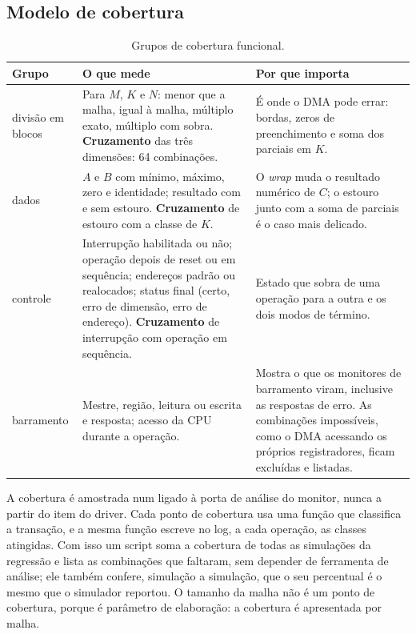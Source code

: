 \documentclass[10pt,a4paper]{article}
\newcommand{\code}[1]{\texttt{\detokenize{#1}}}
\begin{document}
\subsection{Modelo de cobertura}
\label{sec:cobertura}

\begin{table}[htbp]
\centering\small
\caption{Grupos de cobertura funcional.}
\label{tab:covergroups}
\begin{tabular}{@{}L{2.0cm}L{7.6cm}L{5.6cm}@{}}
\toprule
Grupo & O que mede & Por que importa\\
\midrule
divisão em blocos & Para $M$, $K$ e $N$: menor que a malha, igual à malha, múltiplo exato, múltiplo
com sobra. \textbf{Cruzamento} das três dimensões: 64 combinações. & É onde o DMA pode errar:
bordas, zeros de preenchimento e soma dos parciais em $K$.\\
dados & $A$ e $B$ com mínimo, máximo, zero e identidade; resultado com e sem estouro.
\textbf{Cruzamento} de estouro com a classe de $K$. & O \emph{wrap} muda o resultado numérico de $C$; o estouro junto com a soma de parciais é o caso mais delicado.\\
controle & Interrupção habilitada ou não; operação depois de reset ou em sequência; endereços
padrão ou realocados; status final (certo, erro de dimensão, erro de endereço).
\textbf{Cruzamento} de interrupção com operação em sequência. & Estado que sobra de uma operação
para a outra e os dois modos de término.\\
barramento & Mestre, região, leitura ou escrita e resposta; acesso da CPU durante a operação. &
Mostra o que os monitores de barramento viram, inclusive as respostas de erro. As combinações
impossíveis, como o DMA acessando os próprios registradores, ficam excluídas e listadas.\\
\bottomrule
\end{tabular}
\end{table}

A cobertura é amostrada num \code{uvm_subscriber} ligado à porta de análise do monitor, nunca a
partir do item do driver. Cada ponto de cobertura usa uma função que classifica a transação, e a
mesma função escreve no log, a cada operação, as classes atingidas. Com isso um script soma a
cobertura de todas as simulações da regressão e lista as combinações que faltaram, sem depender de
ferramenta de análise; ele também confere, simulação a simulação, que o seu percentual é o mesmo
que o simulador reportou. O tamanho da malha não é um ponto de cobertura, porque é parâmetro de
elaboração: a cobertura é apresentada por malha.
\end{document}
